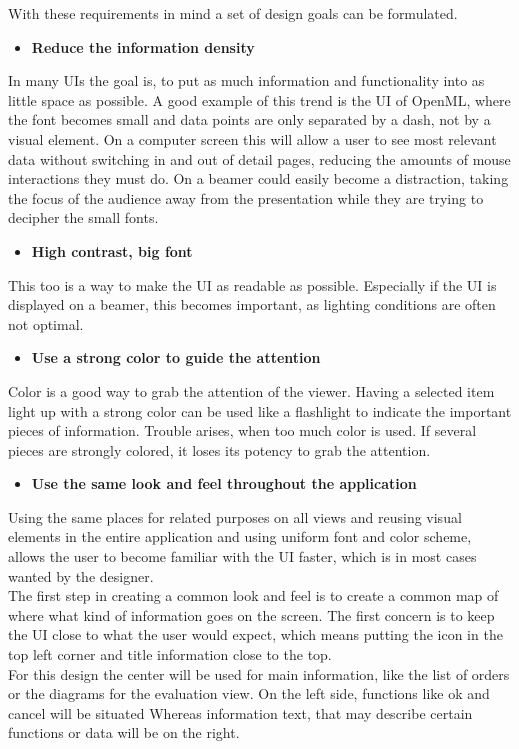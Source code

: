 With these requirements in mind a set of design goals can be formulated.
\begin{itemize}
\item \textbf{Reduce the information density}
\end{itemize}
In many UIs the goal is, to put as much information and functionality into as little space as possible. A good example of this trend is the UI of OpenML, where the font becomes small and data points are only separated by a dash, not by a visual element. On a computer screen this will allow a user to see most relevant data without switching in and out of detail pages, reducing the amounts of mouse interactions they must do. On a beamer could easily become a distraction, taking the focus of the audience away from the presentation while they are trying to decipher the small fonts. 
\begin{itemize}
\item \textbf{High contrast, big font}
\end{itemize}
This too is a way to make the UI as readable as possible. Especially if the UI is displayed on a beamer, this becomes important, as lighting conditions are often not optimal.
\begin{itemize}
\item \textbf{Use a strong color to guide the attention}
\end{itemize}
Color is a good way to grab the attention of the viewer. Having a selected item light up with a strong color can be used like a flashlight to indicate the important pieces of information. Trouble arises, when too much color is used. If several pieces are strongly colored, it loses its potency to grab the attention. 
\begin{itemize}
\item \textbf{Use the same look and feel throughout the application}
\end{itemize}
Using the same places for related purposes on all views and reusing visual elements in the entire application and using uniform font and color scheme, allows the user to become familiar with the UI faster, which is in most cases wanted by the designer. \\
The first step in creating a common look and feel is to create a common map of where what kind of information goes on the screen. The first concern is to keep the UI close to what the user would expect, which means putting the icon in the top left corner and title information close to the top. \\
For this design the center will be used for main information, like the list of orders or the diagrams for the evaluation view. On the left side, functions like ok and cancel will be situated Whereas information text, that may describe certain functions or data will be on the right. 

